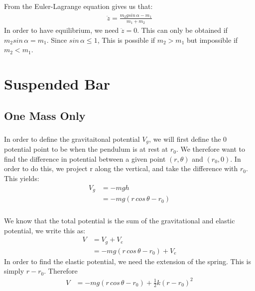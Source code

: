 \documentclass{article}
\begin{document}
\subsection{} %

From the Euler-Lagrange equation gives us that:
\begin{align*}
	\ddot{z} = \frac{ m_2gsin\,\alpha  - m_1}{m_1 + m_2}
\end{align*}
In order to have equilibrium, we need $\ddot{z} = 0$. This can only be obtained if $m_2sin\,\alpha = m_1$. Since $sin\,\alpha \leq 1$, This is possible if $m_2 > m_1$ but impossible if $m_2 < m_1$.

\section{Suspended Bar}

\subsection{One Mass Only}

\subsubsection{} %

In order to define the gravitaitonal potential $V_g$, we will first define the 0 potential point to be when the pendulum is at rest at $r_0$. We therefore want to find the difference in potential between a given point $(r,\theta)$ and $(r_0,0)$. In order to do this, we project r along the vertical, and take the difference with $r_0$. This yields:
\begin{align*}
	V_g &= -mgh\\
	&= -mg(r\,cos\,\theta - r_0)
\end{align*}

\subsubsection{} %

We know that the total potential is the sum of the gravitational and elastic potential, we write this as:
\begin{align*}
	V &= V_g + V_e\\
	&=  -mg(r\,cos\,\theta - r_0) + V_e
\end{align*}
In order to find the elastic potential, we need the extension of the spring. This is simply $r - r_0$. Therefore
\begin{align*}
	V &=  -mg(r\,cos\,\theta - r_0) + \frac{1}{2}k(r-r_0)^2
\end{align*}
\end{document}
